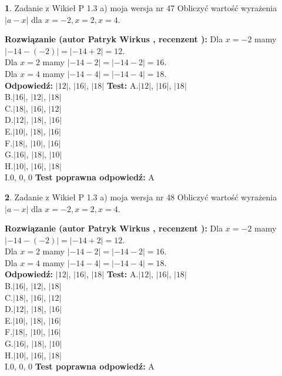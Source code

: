 \documentclass[12pt, a4paper]{article}
\theoremstyle{definition} %
\newtheorem{zad}{}
\newcommand{\zadStart}[1]{\begin{zad}#1\newline}
\newcommand{\zadStop}{\end{zad}}
\newcommand{\rozwStart}[2]{\noindent \textbf{Rozwiązanie (autor #1 , recenzent #2): }\newline}
\newcommand{\rozwStop}{\newline}
\newcommand{\odpStart}{\noindent \textbf{Odpowiedź:}\newline}
\newcommand{\odpStop}{\newline}
\newcommand{\testStart}{\noindent \textbf{Test:}\newline}
\newcommand{\testStop}{\newline}
\newcommand{\kluczStart}{\noindent \textbf{Test poprawna odpowiedź:}\newline}
\newcommand{\kluczStop}{\newline}
\begin{document}
\zadStart{Zadanie z Wikieł P 1.3 a) moja wersja nr 47}
Obliczyć wartość wyrażenia $|a - x|$ dla $x=-2,x=2,x=4$.
\zadStop
\rozwStart{Patryk Wirkus}{}
Dla $x = -2$ mamy $|-14 - (-2)| = |-14 + 2| = 12$.\\
Dla $x = 2$ mamy $|-14 - 2| = |-14 - 2| = 16$.\\
Dla $x = 4$ mamy $|-14 - 4| = |-14 - 4| = 18$.\\
\rozwStop
\odpStart
$|12|$, $|16|$, $|18|$
\odpStop
\testStart
A.$|12|$, $|16|$, $|18|$\\
B.$|16|$, $|12|$, $|18|$\\
C.$|18|$, $|16|$, $|12|$\\
D.$|12|$, $|18|$, $|16|$\\
E.$|10|$, $|18|$, $|16|$\\
F.$|18|$, $|10|$, $|16|$\\
G.$|16|$, $|18|$, $|10|$\\
H.$|10|$, $|16|$, $|18|$\\
I.$0$, $0$, $0$
\testStop
\kluczStart
A
\kluczStop



\zadStart{Zadanie z Wikieł P 1.3 a) moja wersja nr 48}
Obliczyć wartość wyrażenia $|a - x|$ dla $x=-2,x=2,x=4$.
\zadStop
\rozwStart{Patryk Wirkus}{}
Dla $x = -2$ mamy $|-14 - (-2)| = |-14 + 2| = 12$.\\
Dla $x = 2$ mamy $|-14 - 2| = |-14 - 2| = 16$.\\
Dla $x = 4$ mamy $|-14 - 4| = |-14 - 4| = 18$.\\
\rozwStop
\odpStart
$|12|$, $|16|$, $|18|$
\odpStop
\testStart
A.$|12|$, $|16|$, $|18|$\\
B.$|16|$, $|12|$, $|18|$\\
C.$|18|$, $|16|$, $|12|$\\
D.$|12|$, $|18|$, $|16|$\\
E.$|10|$, $|18|$, $|16|$\\
F.$|18|$, $|10|$, $|16|$\\
G.$|16|$, $|18|$, $|10|$\\
H.$|10|$, $|16|$, $|18|$\\
I.$0$, $0$, $0$
\testStop
\kluczStart
A
\kluczStop
\end{document}
